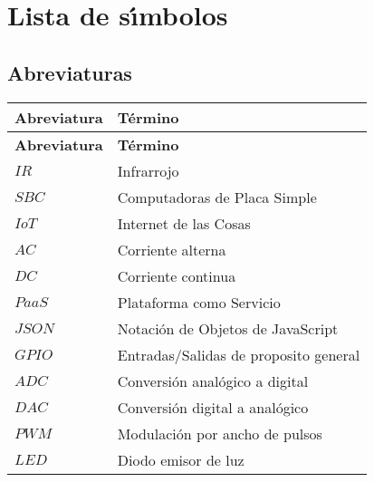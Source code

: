 \chapter*{Lista de s\'{\i}mbolos}

\section*{Abreviaturas}
\begin{longtable}[l]{>{}l<{}l}
  \textbf{Abreviatura} & \textbf{T\'{e}rmino} \\[0.5ex] \hline%
  \endfirsthead%
  \textbf{Abreviatura} & \textbf{T\'{e}rmino} \\[0.5ex] \hline%
  \endhead%
\renewcommand{\arraystretch}{1.4}\label{simbolosg}
 $IR$    &Infrarrojo\\%
 $SBC$   &Computadoras de Placa Simple\\%
 $IoT$   &Internet de las Cosas\\%
 $AC$    &Corriente alterna\\%
 $DC$    &Corriente continua\\%
 $PaaS$  &Plataforma como Servicio\\%
 $JSON$  &Notación de Objetos de JavaScript\\%
 $GPIO$  &Entradas/Salidas de proposito general\\%
 $ADC$	 &Conversión analógico a digital\\%
 $DAC$	 &Conversión digital a analógico\\%
 $PWM$	 &Modulación por ancho de pulsos\\%
 $LED$	 &Diodo emisor de luz\\%

\end{longtable}


\setlength{\extrarowheight}{0pt}